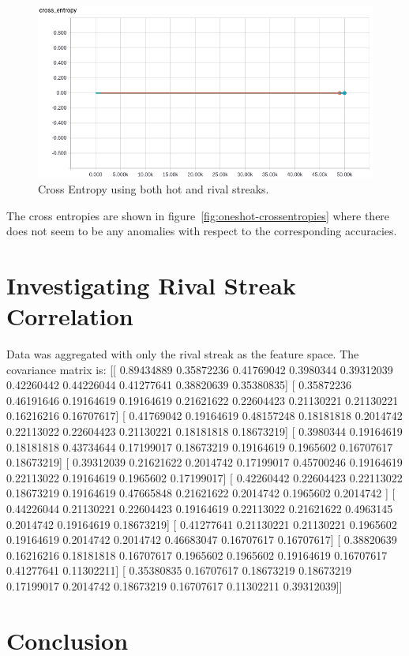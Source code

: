 \documentclass{article} %
\begin{document}
\begin{figure}[!htb]
\endminipage
{}%
  \includegraphics[width=\linewidth]{plots/model1/oneshot/streak-hr/crossentropy.png}
  \caption{Cross Entropy using both hot and rival streaks.}\label{fig:oneshot-hr-crossentropy}
\endminipage
\end{figure}
\label{fig:oneshot-crossentropies}

The cross entropies are shown in figure~\ref{fig:oneshot-crossentropies} where there does not seem to be any anomalies with respect to the corresponding accuracies.



\section{Investigating Rival Streak Correlation}
Data was aggregated with only the rival streak as the feature space.  The covariance matrix is:
[[ 0.89434889  0.35872236  0.41769042  0.3980344   0.39312039  0.42260442
   0.44226044  0.41277641  0.38820639  0.35380835]
 [ 0.35872236  0.46191646  0.19164619  0.19164619  0.21621622  0.22604423
   0.21130221  0.21130221  0.16216216  0.16707617]
 [ 0.41769042  0.19164619  0.48157248  0.18181818  0.2014742   0.22113022
   0.22604423  0.21130221  0.18181818  0.18673219]
 [ 0.3980344   0.19164619  0.18181818  0.43734644  0.17199017  0.18673219
   0.19164619  0.1965602   0.16707617  0.18673219]
 [ 0.39312039  0.21621622  0.2014742   0.17199017  0.45700246  0.19164619
   0.22113022  0.19164619  0.1965602   0.17199017]
 [ 0.42260442  0.22604423  0.22113022  0.18673219  0.19164619  0.47665848
   0.21621622  0.2014742   0.1965602   0.2014742 ]
 [ 0.44226044  0.21130221  0.22604423  0.19164619  0.22113022  0.21621622
   0.4963145   0.2014742   0.19164619  0.18673219]
 [ 0.41277641  0.21130221  0.21130221  0.1965602   0.19164619  0.2014742
   0.2014742   0.46683047  0.16707617  0.16707617]
 [ 0.38820639  0.16216216  0.18181818  0.16707617  0.1965602   0.1965602
   0.19164619  0.16707617  0.41277641  0.11302211]
 [ 0.35380835  0.16707617  0.18673219  0.18673219  0.17199017  0.2014742
   0.18673219  0.16707617  0.11302211  0.39312039]]



\section{Conclusion}
\label{sec:conclusion}


\small{
\nocite{*}


}
\end{document}
